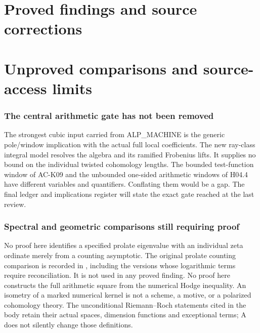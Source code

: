 \documentclass[11pt,a4paper]{article}
\theoremstyle{definition}
\theoremstyle{remark}
\begin{document}
\part{Proved findings and source corrections}







\part{Unproved comparisons and source-access limits}
\section{The central arithmetic gate has not been removed}
The strongest cubic input carried from ALP\_MACHINE is the
generic pole/window implication with the actual full local
coefficients. The new ray-class integral model resolves
the algebra and its ramified Frobenius lifts. It supplies
no bound on the individual twisted cohomology lengths.
The bounded test-function window of AC-K09 and the
unbounded one-sided arithmetic windows of H04.4 have
different variables and quantifiers. Conflating them
would be a gap. The final ledger and implications register
will state the exact gate reached at the last review.

\section{Spectral and geometric comparisons still requiring proof}
No proof here identifies a specified prolate eigenvalue
with an individual zeta ordinate merely from a counting
asymptotic. The original prolate counting comparison is
recorded in ,
including the versions whose logarithmic terms require
reconciliation. It is not used in any proved finding.
No proof here constructs the full arithmetic square
from the numerical Hodge inequality. An isometry of a
marked numerical kernel is not a scheme, a motive, or
a polarized cohomology theory. The unconditional
Riemann--Roch statements cited in the body retain their
actual spaces, dimension functions and exceptional
terms; A does not silently change those definitions.
\end{document}
